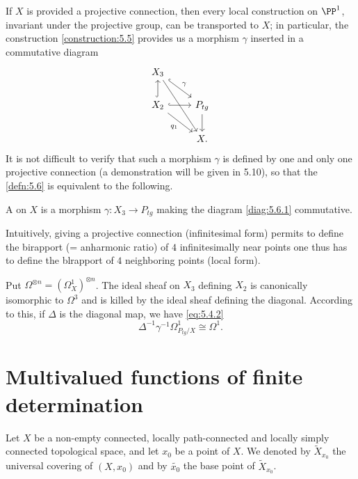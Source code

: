 If $X$ is provided a projective connection, then every local construction on
$\PP^1$, invariant under the projective group, can be transported to $X$; in
particular, the construction \ref{construction:5.5} provides us a morphism
$\gamma$ inserted in a commutative diagram
\begin{equation}\label{diag:5.6.1}
  \begin{tikzcd}
    X_3\ar[dr,hook,"{\gamma}"]\ar[ddr] & \\
    X_2\ar[u,hook]\ar[r,hook]\ar[dr,"{q_1}"'] & P_{tg} \ar[d] \\
    & X.
  \end{tikzcd}
\end{equation}
It is not difficult to verify that such a morphism $\gamma$ is defined by one
and only one projective connection (a demonstration will be given in 5.10), so
that the \cref{defn:5.6} is equivalent to the following.
\setcounter{definition}{5}
\begin{definition}
  A  on $X$ is a morphism
  $\gamma\colon X_3\to P_{tg}$ making the diagram \cref{diag:5.6.1} commutative.
\end{definition}

Intuitively, giving a projective connection (infinitesimal form) permits to
define the birapport (= anharmonic ratio) of $4$ infinitesimally near points
one thus has to define the blrapport of $4$ neighboring points (local form).

\begin{para}
  Put $\Omega^{\otimes n}=(\Omega_X^1)^{\otimes n}$.
  The ideal sheaf on $X_3$ defining $X_2$ is canonically isomorphic to
  $\Omega^3$ and is killed by the ideal sheaf defining the diagonal.
  According to this, if $\Delta$ is the diagonal map, we have \cref{eq:5.4.2}
  \[
  \Delta^{-1}\gamma^{-1}\Omega_{P_{tg}/X}^1\cong\Omega^1.
  \]
\end{para}









\clearpage
\section{Multivalued functions of finite determination}
\begin{para}\label{hypothesis:6.1}
  Let $X$ be a non-empty connected, locally path-connected and locally simply
  connected topological space, and let $x_0$ be a point of $X$.
  We denoted by $\widetilde{X}_{x_0}$ the universal covering of $(X,x_0)$ and by
  $\widetilde{x_0}$ the base point of $\widetilde{X}_{x_0}$.
\end{para}

